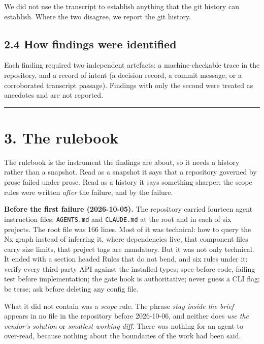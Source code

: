 \documentclass[11pt,a4paper]{article}
\begin{document}
We did not use the transcript to establish anything that the git history can establish. Where the two disagree, we report the git history.

\subsection*{2.4 How findings were identified}

Each finding required two independent artefacts: a machine-checkable trace in the repository, and a record of intent (a decision record, a commit message, or a corroborated transcript passage). Findings with only the second were treated as anecdotes and are not reported.

\medskip\hrule\medskip

\section*{3. The rulebook}

The rulebook is the instrument the findings are about, so it needs a history rather than a snapshot. Read as a snapshot it says that a repository governed by prose failed under prose. Read as a history it says something sharper: the scope rules were written \emph{after} the failure, and by the failure.

\textbf{Before the first failure (2026-10-05).} The repository carried fourteen agent instruction files: \texttt{AGENTS.md} and \texttt{CLAUDE.md} at the root and in each of six projects. The root file was 166 lines. Most of it was technical: how to query the Nx graph instead of inferring it, where dependencies live, that component files carry size limits, that project tags are mandatory. But it was not only technical. It ended with a section headed \textquotedbl{}Rules that do not bend\textquotedbl{}, and six rules under it: verify every third-party API against the installed types; spec before code, failing test before implementation; the gate hook is authoritative; never guess a CLI flag; be terse; ask before deleting any config file.

What it did not contain was a \emph{scope} rule. The phrase \emph{stay inside the brief} appears in no file in the repository before 2026-10-06, and neither does \emph{use the vendor's solution} or \emph{smallest working diff}. There was nothing for an agent to over-read, because nothing about the boundaries of the work had been said.
\end{document}
